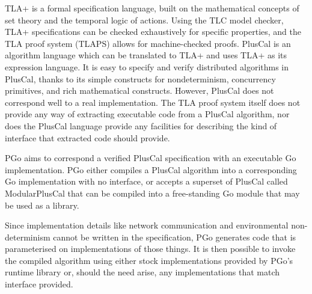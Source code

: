 TLA+ is a formal specification language, built on the mathematical concepts of set theory and the temporal logic of actions. Using the TLC model checker, TLA+ specifications can be checked exhaustively for specific properties, and the TLA proof system (TLAPS) allows for machine-checked proofs. PlusCal is an algorithm language which can be translated to TLA+ and uses TLA+ as its expression language. It is easy to specify and verify distributed algorithms in PlusCal, thanks to its simple constructs for nondeterminism, concurrency primitives, and rich mathematical constructs. However, PlusCal does not correspond well to a real implementation. The TLA proof system itself does not provide any way of extracting executable code from a PlusCal algorithm, nor does the PlusCal language provide any facilities for describing the kind of interface that extracted code should provide.

PGo aims to correspond a verified PlusCal specification with an executable Go implementation. PGo either compiles a PlusCal algorithm into a corresponding Go implementation with no interface, or accepts a superset of PlusCal called ModularPlusCal that can be compiled into a free-standing Go module that may be used as a library.

Since implementation details like network communication and environmental non-determinism cannot be written in the specification, PGo generates code that is parameterised on implementations of those things. It is then possible to invoke the compiled algorithm using either stock implementations provided by PGo's runtime library or, should the need arise, any implementations that match interface provided.